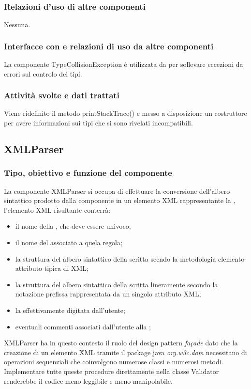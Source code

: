 \documentclass[11pt,titlepage,a4paper]{report}
\begin{document}
\subsubsection{Relazioni d'uso di altre componenti}
Nessuna.
\subsubsection{Interfacce con e relazioni di uso da altre componenti}
La componente TypeCollisionException \`e utilizzata da \brp per sollevare eccezioni da errori sul controlo dei tipi.
\subsubsection{Attivit\`a svolte e dati trattati}
Viene ridefinito il metodo printStackTrace() e messo a disposizione un costruttore per avere informazioni sui tipi che si sono rivelati incompatibili.

\subsection{XMLParser}%
\subsubsection{Tipo, obiettivo e funzione del componente}
La componente XMLParser si occupa di effettuare la conversione dell'albero sintattico prodotto dalla componente \brp in un elemento XML rappresentante la \br, l'elemento XML risultante conterr\`a:
\begin{itemize}
 \item il nome della \br, che deve essere univoco;
 \item il nome del \bo associato a quela regola;
 \item la struttura del albero sintattico della \br scritta secndo la metodologia elemento-attributo tipica di XML;
 \item la struttura del albero sintattico della \br scritta lineramente secondo la notazione prefissa rappresentata da un singolo attributo XML;
 \item la \br effettivamente digitata dall'utente;
 \item eventuali commenti associati dall'utente alla \br;
\end{itemize}
XMLParser ha in questo contesto il ruolo del design pattern \textit{fa\c{c}ade} dato che la creazione di un elemento XML tramite il package java \textit{org.w3c.dom} necessitano di operazioni sequenziali che coinvolgono numerose classi e numerosi metodi. Implementare tutte queste procedure direttamente nella classe Validator renderebbe il codice meno leggibile e meno manipolabile.
\end{document}
